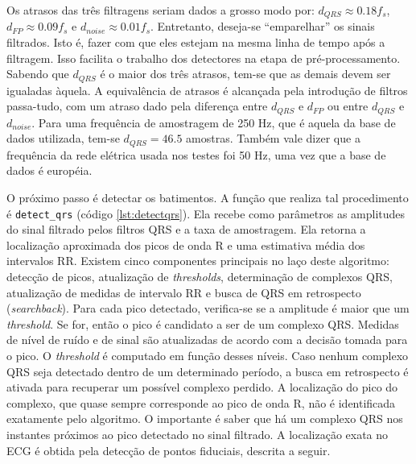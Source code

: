 Os atrasos das três filtragens seriam dados a grosso modo por: $d_{QRS} \approx 0.18f_s$, $d_{FP} \approx 0.09f_s$ e $d_{noise} \approx 0.01f_s$. Entretanto, deseja-se ``emparelhar'' os sinais filtrados. Isto é, fazer com que eles estejam na mesma linha de tempo após a filtragem. Isso facilita o trabalho dos detectores na etapa de pré-processamento. Sabendo que $d_{QRS}$ é o maior dos três atrasos, tem-se que as demais devem ser igualadas àquela. A equivalência de atrasos é alcançada pela introdução de filtros passa-tudo, com um atraso dado pela diferença entre $d_{QRS}$ e $d_{FP}$ ou entre $d_{QRS}$ e $d_{noise}$. Para uma frequência de amostragem de 250 Hz, que é aquela da base de dados utilizada, tem-se $d_{QRS} = 46.5$ amostras. Também vale dizer que a frequência da rede elétrica usada nos testes foi 50 Hz, uma vez que a base de dados é européia.

O próximo passo é detectar os batimentos. A função que realiza tal procedimento é \texttt{detect\_qrs} (código \ref{lst:detectqrs}). Ela recebe como parâmetros as amplitudes do sinal filtrado pelos filtros QRS e a taxa de amostragem. Ela retorna a localização aproximada dos picos de onda R e uma estimativa média dos intervalos RR. Existem cinco componentes principais no laço deste algoritmo: detecção de picos, atualização de \emph{thresholds}, determinação de complexos QRS, atualização de medidas de intervalo RR e busca de QRS em retrospecto (\emph{searchback}). Para cada pico detectado, verifica-se se a amplitude é maior que um \emph{threshold}. Se for, então o pico é candidato a ser de um complexo QRS. Medidas de nível de ruído e de sinal são atualizadas de acordo com a decisão tomada para o pico. O \emph{threshold} é computado em função desses níveis. Caso nenhum complexo QRS seja detectado dentro de um determinado período, a busca em retrospecto é ativada para recuperar um possível complexo perdido. A localização do pico do complexo, que quase sempre corresponde ao pico de onda R, não é identificada exatamente pelo algoritmo. O importante é saber que há um complexo QRS nos instantes próximos ao pico detectado no sinal filtrado. A localização exata no ECG é obtida pela detecção de pontos fiduciais, descrita a seguir.

